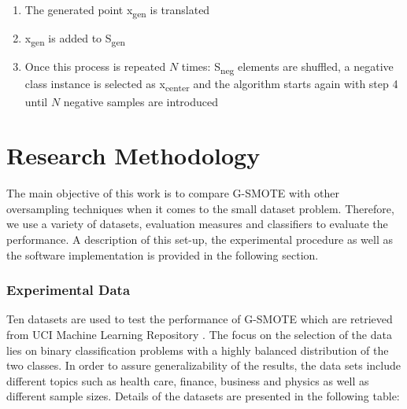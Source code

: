 \documentclass[parskip=full]{scrartcl}
\begin{document}
\begin{enumerate}
	\item 
	The generated point x\textsubscript{gen} is translated
	\item 
	x\textsubscript{gen} is added to S\textsubscript{gen}
	\item 
	Once this process is repeated $\mathit{N}$ times: S\textsubscript{neg} 
	elements are shuffled, a negative class instance is selected as 
	x\textsubscript{center} and the algorithm starts again with step 4 until 
	$\mathit{N}$ negative samples are introduced
\end{enumerate}

\section{Research Methodology}

The main objective of this work is to compare G-SMOTE with other oversampling 
techniques when it comes to the small dataset problem. Therefore, we use a 
variety of datasets, evaluation measures and classifiers to evaluate the 
performance. A description of this set-up, the experimental procedure as well 
as the software implementation is provided in the following section.

\subsubsection{Experimental Data}

Ten datasets are used to test the performance of G-SMOTE which are retrieved 
from UCI Machine Learning Repository \cite{Dua.2019}. The focus on the 
selection of the data lies on binary classification problems with a highly 
balanced distribution of the two classes. In order to assure generalizability 
of the results, the data sets include different topics such as health care, 
finance, business and physics as well as different sample sizes. Details of the 
datasets are presented in the following table:
\end{document}
